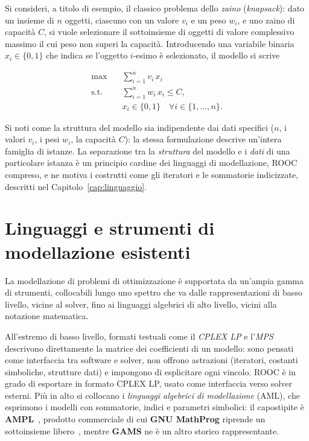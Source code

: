 Si consideri, a titolo di esempio, il classico problema dello \emph{zaino}
(\emph{knapsack}): dato un insieme di $n$ oggetti, ciascuno con un valore $v_i$
e un peso $w_i$, e uno zaino di capacità $C$, si vuole selezionare il
sottoinsieme di oggetti di valore complessivo massimo il cui peso non superi la
capacità. Introducendo una variabile binaria $x_i \in \{0,1\}$ che indica se
l'oggetto $i$-esimo è selezionato, il modello si scrive

\begin{equation}
\label{eq:knapsack}
\begin{aligned}
\max \quad & \sum_{i=1}^{n} v_i\, x_i \\
\text{s.t.} \quad & \sum_{i=1}^{n} w_i\, x_i \le C, \\
                  & x_i \in \{0, 1\} \quad \forall i \in \{1, \dots, n\}.
\end{aligned}
\end{equation}

Si noti come la struttura del modello sia indipendente dai dati specifici
($n$, i valori $v_i$, i pesi $w_i$, la capacità $C$): la stessa formulazione
descrive un'intera famiglia di istanze. La separazione tra la \emph{struttura}
del modello e i \emph{dati} di una particolare istanza è un principio cardine dei
linguaggi di modellazione, ROOC compreso, e ne motiva i costrutti come gli
iteratori e le sommatorie indicizzate, descritti nel
Capitolo~\ref{cap:linguaggio}.

\section{Linguaggi e strumenti di modellazione esistenti}
\label{sec:stato-arte}

La modellazione di problemi di ottimizzazione è supportata da un'ampia gamma di
strumenti, collocabili lungo uno spettro che va dalle rappresentazioni di basso
livello, vicine al solver, fino ai linguaggi algebrici di alto livello, vicini
alla notazione matematica.

All'estremo di basso livello, formati testuali come il \emph{CPLEX LP} e l'\emph{MPS}
descrivono direttamente la matrice dei coefficienti di un modello: sono pensati
come interfaccia tra software e solver, non offrono astrazioni (iteratori,
costanti simboliche, strutture dati) e impongono di esplicitare ogni vincolo.
ROOC è in grado di esportare in formato CPLEX LP, usato come interfaccia verso
solver esterni. Più in alto si collocano i \emph{linguaggi algebrici di
modellazione} (AML), che esprimono i modelli con sommatorie, indici e parametri
simbolici: il capostipite è \textbf{AMPL}~\cite{ampl2003}, prodotto commerciale
di cui \textbf{GNU MathProg} riprende un sottoinsieme libero~\cite{glpk}, mentre
\textbf{GAMS} ne è un altro storico rappresentante.

